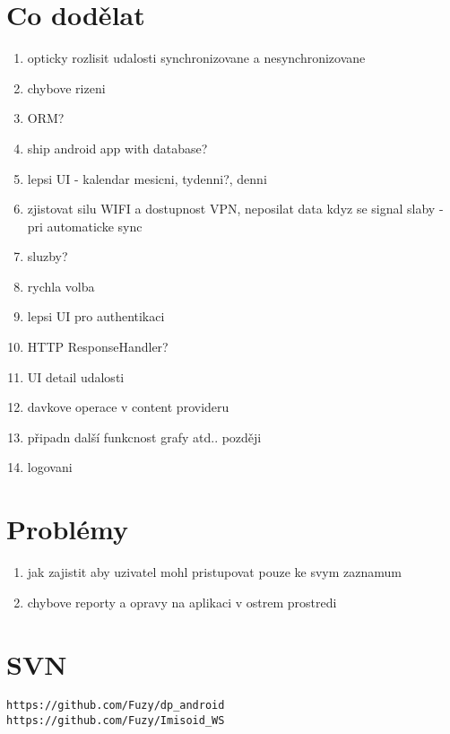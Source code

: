\documentclass{bakalarka}
\begin{document}
\section{Co dodělat}
\begin{enumerate}
\item opticky rozlisit udalosti synchronizovane a nesynchronizovane
\item chybove rizeni
\item ORM?
\item ship android app with database?
\item lepsi UI - kalendar mesicni, tydenni?, denni
\item zjistovat silu WIFI a dostupnost VPN, neposilat data kdyz se signal slaby - pri automaticke sync
\item sluzby?
\item rychla volba 
\item lepsi UI pro authentikaci
\item HTTP ResponseHandler?
\item UI detail udalosti
\item davkove operace v content provideru
\item připadn další funkcnost grafy atd.. později
\item logovani
\end{enumerate}

\section{Problémy}
\begin{enumerate}
\item jak zajistit aby uzivatel mohl pristupovat pouze ke svym zaznamum
\item chybove reporty a opravy na aplikaci v ostrem prostredi
\end{enumerate}

\section{SVN}
\begin{verbatim}
https://github.com/Fuzy/dp_android
https://github.com/Fuzy/Imisoid_WS
\end{verbatim}

\appendix

%
\end{document}

